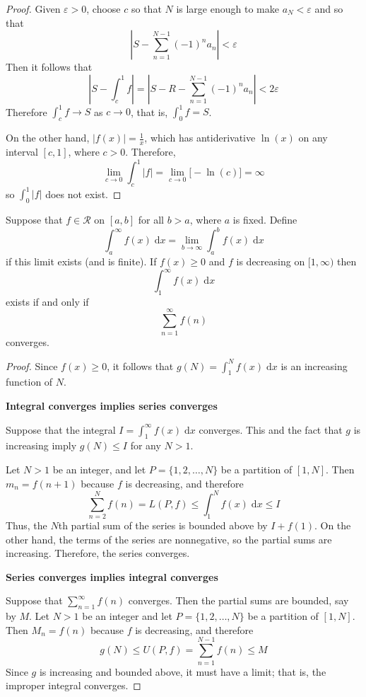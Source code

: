 \documentclass{homework}
\begin{document}
\begin{alphaparts}
\begin{proof}
			Given $\varepsilon > 0$, choose $c$ so that $N$ is large enough to make $a_N < \varepsilon$ and so that
			$$
			\left|S - \sum_{n=1}^{N-1}(-1)^na_n\right| < \varepsilon
			$$
			Then it follows that
			$$
			\left|S - \int_c^1f\right| = \left|S - R - \sum_{n=1}^{N-1}(-1)^na_n\right| < 2\varepsilon
			$$
			Therefore $\int_c^1 f \to S$ as $c \to 0$, that is, $\int_0^1 f = S$.
			
			On the other hand, $|f(x)| = \frac{1}{x}$, which has antiderivative $\ln(x)$ on any interval $[c,1]$, where $c > 0$. Therefore,
			$$
			\lim_{c\to 0}\int_c^1|f| = \lim_{c\to 0}\big[-\ln(c)\big] = \infty
			$$
			so $\int_0^1|f|$ does not exist.
		\end{proof}
	\end{alphaparts}
	
	
	Suppose that $f \in \mathscr{R}$ on $[a,b]$ for all $b > a$, where $a$ is fixed. Define
	$$
	\int_a^\infty f(x)\;\text{d}x = \lim_{b\to\infty}\int_a^bf(x)\;\text{d}x
	$$
	if this limit exists (and is finite). If $f(x) \ge 0$ and $f$ is decreasing on $[1, \infty)$ then
	$$
	\int_1^\infty f(x)\;\text{d}x
	$$
	exists if and only if
	$$
	\sum_{n=1}^\infty f(n)
	$$
	converges.
	
	\begin{proof} 
		Since $f(x) \ge 0$, it follows that $g(N)=\int_1^N f(x)\;\text{d}x$ is an increasing function of $N$.
	
		\textbf{Integral converges implies series converges}
	
		Suppose that the integral $I = \int_1^\infty f(x)\;\text{d}x$ converges. This and the fact that $g$ is increasing imply $g(N) \le I$ for any $N > 1$. 
		
		Let $N > 1$ be an integer, and let $P = \{1,2,\dots, N\}$ be a partition of $[1,N]$. Then $m_n = f(n + 1)$ because $f$ is decreasing, and therefore
		$$
		\sum_{n=2}^N f(n) = L(P, f) \le \int_1^Nf(x)\;\text{d}x \le I
		$$
		Thus, the $N$th partial sum of the series is bounded above by $I + f(1)$. On the other hand, the terms of the series are nonnegative, so the partial sums are increasing. Therefore, the series converges.
		
		\textbf{Series converges implies integral converges}
		
		Suppose that $\sum_{n=1}^\infty f(n)$ converges. Then the partial sums are bounded, say by $M$. Let $N > 1$ be an integer and let $P = \{1, 2, \dots, N\}$ be a partition of $[1,N]$. Then $M_n = f(n)$ because $f$ is decreasing, and therefore
		$$
		g(N) \le U(P, f) = \sum_{n=1}^{N-1}f(n) \le M
		$$
		Since $g$ is increasing and bounded above, it must have a limit; that is, the improper integral converges.
	\end{proof}
	
\end{document}
